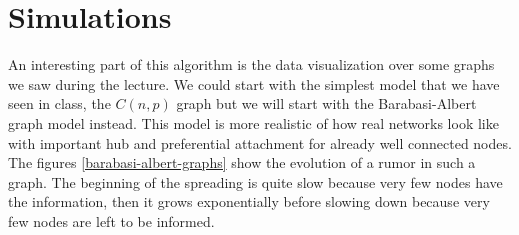 \documentclass[10pt,journal,a4paper]{IEEEtran}
\begin{document}
\section{Simulations}

An interesting part of this algorithm is the data visualization over some graphs we saw during the lecture. We could start with the simplest model that we have seen in class, the $C(n,p)$ graph but we will start with the Barabasi-Albert graph model instead. This model is more realistic of how real networks look like with important hub and preferential attachment for already well connected nodes. The figures \ref{barabasi-albert-graphs} show the evolution of a rumor in such a graph. The beginning of the spreading is quite slow because very few nodes have the information, then it grows exponentially before slowing down because very few nodes are left to be informed. 
\end{document}
